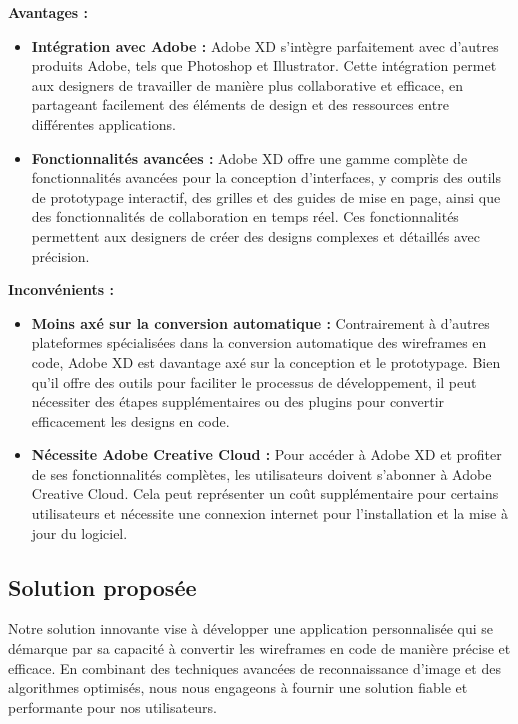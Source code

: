 \textbf{Avantages :}
\begin{itemize}
    \item \textbf{Intégration avec Adobe :} Adobe XD s'intègre parfaitement avec d'autres produits Adobe, tels que Photoshop et Illustrator. Cette intégration permet aux designers de travailler de manière plus collaborative et efficace, en partageant facilement des éléments de design et des ressources entre différentes applications.

    \item \textbf{Fonctionnalités avancées :} Adobe XD offre une gamme complète de fonctionnalités avancées pour la conception d'interfaces, y compris des outils de prototypage interactif, des grilles et des guides de mise en page, ainsi que des fonctionnalités de collaboration en temps réel. Ces fonctionnalités permettent aux designers de créer des designs complexes et détaillés avec précision.
\end{itemize}

\textbf{Inconvénients :}
\begin{itemize}
    \item \textbf{Moins axé sur la conversion automatique :} Contrairement à d'autres plateformes spécialisées dans la conversion automatique des wireframes en code, Adobe XD est davantage axé sur la conception et le prototypage. Bien qu'il offre des outils pour faciliter le processus de développement, il peut nécessiter des étapes supplémentaires ou des plugins pour convertir efficacement les designs en code.

    \item \textbf{Nécessite Adobe Creative Cloud :} Pour accéder à Adobe XD et profiter de ses fonctionnalités complètes, les utilisateurs doivent s'abonner à Adobe Creative Cloud. Cela peut représenter un coût supplémentaire pour certains utilisateurs et nécessite une connexion internet pour l'installation et la mise à jour du logiciel.
\end{itemize}


\subsection{Solution proposée}

Notre solution innovante vise à développer une application personnalisée qui se démarque par sa capacité à convertir les wireframes en code de manière précise et efficace. En combinant des techniques avancées de reconnaissance d'image et des algorithmes optimisés, nous nous engageons à fournir une solution fiable et performante pour nos utilisateurs.

